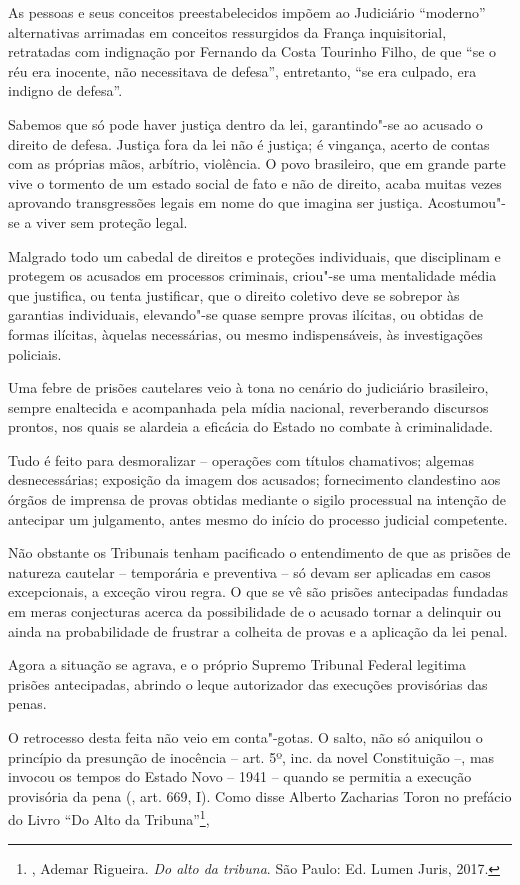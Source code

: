 As pessoas e seus conceitos preestabelecidos impõem ao Judiciário
``moderno'' alternativas arrimadas em conceitos ressurgidos da França
inquisitorial, retratadas com indignação por Fernando da Costa Tourinho
Filho, de que ``se o réu era inocente, não necessitava de defesa'',
entretanto, ``se era culpado, era indigno de defesa''.

Sabemos que só pode haver justiça dentro da lei, garantindo"-se ao
acusado o direito de defesa. Justiça fora da lei não é justiça; é
vingança, acerto de contas com as próprias mãos, arbítrio, violência. O
povo brasileiro, que em grande parte vive o tormento de um estado social
de fato e não de direito, acaba muitas vezes aprovando transgressões
legais em nome do que imagina ser justiça. Acostumou"-se a viver sem
proteção legal.

Malgrado todo um cabedal de direitos e proteções individuais, que
disciplinam e protegem os acusados em processos criminais, criou"-se uma
mentalidade média que justifica, ou tenta justificar, que o direito
coletivo deve se sobrepor às garantias individuais, elevando"-se quase
sempre provas ilícitas, ou obtidas de formas ilícitas, àquelas
necessárias, ou mesmo indispensáveis, às investigações policiais.

Uma febre de prisões cautelares veio à tona no cenário do judiciário
brasileiro, sempre enaltecida e acompanhada pela mídia nacional,
reverberando discursos prontos, nos quais se alardeia a eficácia do
Estado no combate à criminalidade.

Tudo é feito para desmoralizar -- operações com títulos chamativos;
algemas desnecessárias; exposição da imagem dos acusados; fornecimento
clandestino aos órgãos de imprensa de provas obtidas mediante o sigilo
processual na intenção de antecipar um julgamento, antes mesmo do início
do processo judicial competente.

Não obstante os Tribunais tenham pacificado o entendimento de que as
prisões de natureza cautelar -- temporária e preventiva -- só devam ser
aplicadas em casos excepcionais, a exceção virou regra. O que se vê são
prisões antecipadas fundadas em meras conjecturas acerca da
possibilidade de o acusado tornar a delinquir ou ainda na probabilidade
de frustrar a colheita de provas e a aplicação da lei penal.

Agora a situação se agrava, e o próprio Supremo Tribunal Federal
legitima prisões antecipadas, abrindo o leque autorizador das execuções
provisórias das penas.

O retrocesso desta feita não veio em conta"-gotas. O salto, não só
aniquilou o princípio da presunção de inocência -- art. 5º,
inc.  da novel Constituição --, mas invocou os tempos do Estado Novo
-- 1941 -- quando se permitia a execução provisória da pena (, art.
669, I). Como disse Alberto Zacharias Toron no prefácio do Livro ``Do
Alto da Tribuna''\footnote{, Ademar Rigueira. \emph{Do alto da tribuna}.
São Paulo: Ed. Lumen Juris, 2017.},

